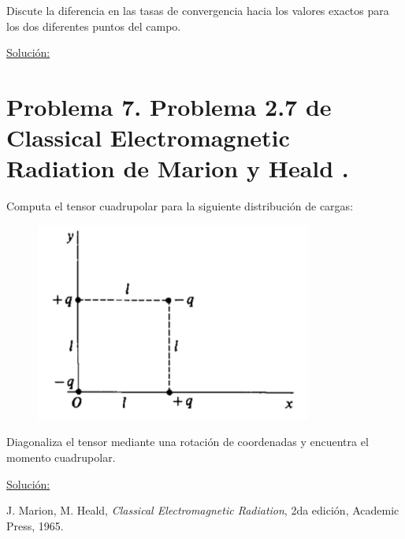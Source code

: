 \documentclass[a4paper,11pt]{article}
\numberwithin{equation}{section}
\begin{document}
Discute la diferencia en las tasas de convergencia hacia los valores exactos para 
los dos diferentes puntos del campo.

\vspace{.3cm}

\underline{Solución:} \vspace{.3cm}

\section{Problema 7. Problema 2.7 de Classical Electromagnetic Radiation
de Marion y Heald \cite{marion2}.}

Computa el tensor cuadrupolar para la siguiente distribución de cargas:

\begin{figure}[H]
\center
 \includegraphics[scale=0.6]{problema7fig1}
\end{figure}

Diagonaliza el tensor mediante una rotación de coordenadas y encuentra el momento
cuadrupolar.

\vspace{.3cm}

\underline{Solución:} \vspace{.3cm}


\begin{thebibliography}{10}
J. Marion, M. Heald, \emph{Classical Electromagnetic Radiation}, 2da edición, Academic 
Press, 1965.
\end{thebibliography}
\end{document}
